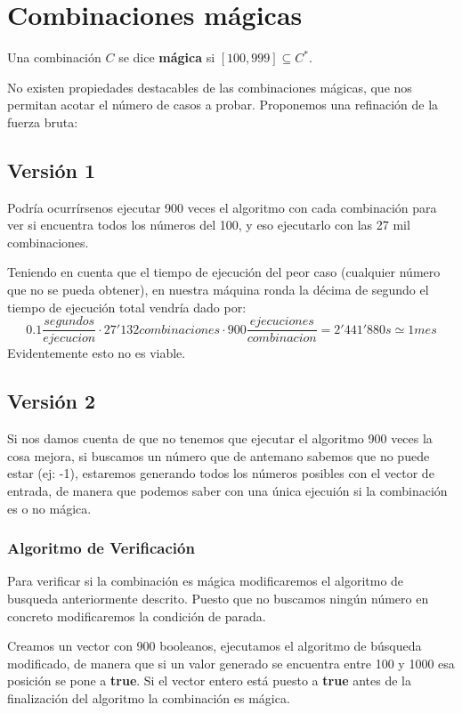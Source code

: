 \section{Combinaciones mágicas}

\begin{definition}
  Una combinación $C$ se dice \textbf{mágica} si $[100,999] \subseteq C^{\ast}$.
\end{definition}

No existen propiedades destacables de las combinaciones mágicas, que nos permitan
acotar el número de casos a probar. Proponemos una refinación de la fuerza bruta:

\subsection{Versión 1}
Podría ocurrírsenos ejecutar 900 veces el algoritmo con cada combinación para
ver si encuentra todos los números del 100, y eso ejecutarlo con las 27 mil
combinaciones.

Teniendo en cuenta que el tiempo de ejecución del peor caso (cualquier número
que no se pueda obtener), en nuestra máquina ronda la décima de segundo el %
tiempo de ejecución total vendría dado por:
$$ 0.1\frac{segundos}{ejecucion} \cdot 27'132 combinaciones  \cdot 900 \frac{ejecuciones}{combinacion}=2'441'880s \simeq 1 mes$$
Evidentemente esto no es viable.

\subsection{Versión 2}
Si nos damos cuenta de que no tenemos que ejecutar el algoritmo 900 veces la
cosa mejora, si buscamos un número que de antemano sabemos que no puede estar
(ej: -1), estaremos generando todos los números posibles con el vector de
entrada, de manera que podemos saber con una única ejecuión si la
combinación es o no mágica.

\subsubsection{Algoritmo de Verificación}
Para verificar si la combinación es mágica modificaremos el algoritmo de
busqueda anteriormente descrito. Puesto que no buscamos ningún número en
concreto modificaremos la condición de parada.

Creamos un vector con 900 booleanos, ejecutamos el algoritmo de búsqueda
modificado, de manera que si un valor generado se encuentra entre 100 y 1000
esa posición se pone a \textbf{true}. Si el vector entero está puesto a
\textbf{true} antes de la finalización del algoritmo la combinación es mágica.

